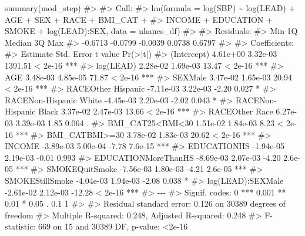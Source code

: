\documentclass[
  letterpaper,
]{krantz}
\makeatletter
\newenvironment{Shaded}{\begin{snugshade}}{\end{snugshade}}
\newcommand{\CommentTok}[1]{\textcolor[rgb]{0.37,0.37,0.37}{#1}}
\newcommand{\FunctionTok}[1]{\textcolor[rgb]{0.28,0.35,0.67}{#1}}
\newcommand{\NormalTok}[1]{\textcolor[rgb]{0.00,0.23,0.31}{#1}}
\newenvironment{kframe}{%
\medskip{}
\setlength{\fboxsep}{.8em}
 \def\at@end@of@kframe{}%
 \ifinner\ifhmode%
  \def\at@end@of@kframe{\end{minipage}}%
  \begin{minipage}{\columnwidth}%
 \fi\fi%
 \def\FrameCommand##1{\hskip\@totalleftmargin \hskip-\fboxsep
 \colorbox{shadecolor}{##1}\hskip-\fboxsep
     \hskip-\linewidth \hskip-\@totalleftmargin \hskip\columnwidth}%
 \MakeFramed {\advance\hsize-\width
   \@totalleftmargin\z@ \linewidth\hsize
   \@setminipage}}%
 {\par\unskip\endMakeFramed%
 \at@end@of@kframe}
\renewenvironment{Shaded}{\begin{kframe}}{\end{kframe}}
\makeatother
\begin{document}
\begin{Shaded}
\begin{Highlighting}[]
\FunctionTok{summary}\NormalTok{(mod\_step)}
\CommentTok{\#\textgreater{} }
\CommentTok{\#\textgreater{} Call:}
\CommentTok{\#\textgreater{} lm(formula = log(SBP) \textasciitilde{} log(LEAD) + AGE + SEX + RACE + BMI\_CAT + }
\CommentTok{\#\textgreater{}     INCOME + EDUCATION + SMOKE + log(LEAD):SEX, data = nhanes\_df)}
\CommentTok{\#\textgreater{} }
\CommentTok{\#\textgreater{} Residuals:}
\CommentTok{\#\textgreater{}     Min      1Q  Median      3Q     Max }
\CommentTok{\#\textgreater{} {-}0.6713 {-}0.0799 {-}0.0039  0.0738  0.6797 }
\CommentTok{\#\textgreater{} }
\CommentTok{\#\textgreater{} Coefficients:}
\CommentTok{\#\textgreater{}                         Estimate Std. Error t value Pr(\textgreater{}|t|)    }
\CommentTok{\#\textgreater{} (Intercept)             4.61e+00   3.32e{-}03 1391.51  \textless{} 2e{-}16 ***}
\CommentTok{\#\textgreater{} log(LEAD)               2.28e{-}02   1.69e{-}03   13.47  \textless{} 2e{-}16 ***}
\CommentTok{\#\textgreater{} AGE                     3.48e{-}03   4.85e{-}05   71.87  \textless{} 2e{-}16 ***}
\CommentTok{\#\textgreater{} SEXMale                 3.47e{-}02   1.65e{-}03   20.94  \textless{} 2e{-}16 ***}
\CommentTok{\#\textgreater{} RACEOther Hispanic     {-}7.11e{-}03   3.22e{-}03   {-}2.20    0.027 *  }
\CommentTok{\#\textgreater{} RACENon{-}Hispanic White {-}4.45e{-}03   2.20e{-}03   {-}2.02    0.043 *  }
\CommentTok{\#\textgreater{} RACENon{-}Hispanic Black  3.37e{-}02   2.47e{-}03   13.66  \textless{} 2e{-}16 ***}
\CommentTok{\#\textgreater{} RACEOther Race          6.27e{-}03   3.39e{-}03    1.85    0.064 .  }
\CommentTok{\#\textgreater{} BMI\_CAT25\textless{}BMI\textless{}30        1.51e{-}02   1.84e{-}03    8.23  \textless{} 2e{-}16 ***}
\CommentTok{\#\textgreater{} BMI\_CATBMI\textgreater{}=30          3.78e{-}02   1.83e{-}03   20.62  \textless{} 2e{-}16 ***}
\CommentTok{\#\textgreater{} INCOME                 {-}3.89e{-}03   5.00e{-}04   {-}7.78  7.6e{-}15 ***}
\CommentTok{\#\textgreater{} EDUCATIONHS            {-}1.94e{-}05   2.19e{-}03   {-}0.01    0.993    }
\CommentTok{\#\textgreater{} EDUCATIONMoreThanHS    {-}8.69e{-}03   2.07e{-}03   {-}4.20  2.6e{-}05 ***}
\CommentTok{\#\textgreater{} SMOKEQuitSmoke         {-}7.56e{-}03   1.80e{-}03   {-}4.21  2.6e{-}05 ***}
\CommentTok{\#\textgreater{} SMOKEStillSmoke        {-}4.04e{-}03   1.94e{-}03   {-}2.08    0.038 *  }
\CommentTok{\#\textgreater{} log(LEAD):SEXMale      {-}2.61e{-}02   2.12e{-}03  {-}12.28  \textless{} 2e{-}16 ***}
\CommentTok{\#\textgreater{} {-}{-}{-}}
\CommentTok{\#\textgreater{} Signif. codes:  0 \textquotesingle{}***\textquotesingle{} 0.001 \textquotesingle{}**\textquotesingle{} 0.01 \textquotesingle{}*\textquotesingle{} 0.05 \textquotesingle{}.\textquotesingle{} 0.1 \textquotesingle{} \textquotesingle{} 1}
\CommentTok{\#\textgreater{} }
\CommentTok{\#\textgreater{} Residual standard error: 0.126 on 30389 degrees of freedom}
\CommentTok{\#\textgreater{} Multiple R{-}squared:  0.248,  Adjusted R{-}squared:  0.248 }
\CommentTok{\#\textgreater{} F{-}statistic:  669 on 15 and 30389 DF,  p{-}value: \textless{}2e{-}16}
\end{Highlighting}
\end{Shaded}
\end{document}
